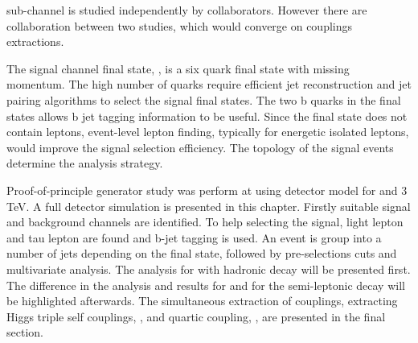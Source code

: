 \eeToHHbbbb  sub-channel is studied independently by collaborators. However there are collaboration between two studies, which would converge on couplings extractions.


The signal channel final state, \eeToHHbbWWHadFull, is a six quark final state with missing momentum. The high number of quarks require efficient jet reconstruction and jet pairing algorithms to select the signal final states. The two b quarks in the final states allows b jet tagging information to be useful. Since the final state does not contain leptons, event-level lepton finding, typically for energetic isolated leptons,  would improve the signal selection efficiency. The topology of the signal events determine the analysis strategy.

Proof-of-principle generator study was perform at \CLIC using \CLICILD detector model for  and 3\,TeV\cite{Linssen:2012hp}. A full \CLICILD detector simulation is presented in this chapter. Firstly suitable signal and background channels are identified. To help selecting the signal, light lepton and tau lepton are found and b-jet tagging is used. An event is group into a number of jets depending on the final state, followed by pre-selections cuts and multivariate analysis. The analysis for  with \eeToHHbbWW hadronic decay will be presented first. The difference in the analysis and results for  and for the \eeToHHbbWW semi-leptonic decay will be highlighted afterwards. The simultaneous extraction of couplings, extracting Higgs triple self couplings, \gHHH, and quartic coupling, \gWWHH, are presented in the final section.

